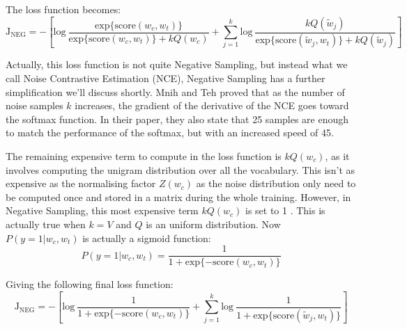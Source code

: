 The loss function becomes:
\begin{equation}
    \text{J}_{\text{NEG}}  = -\left[\text{log}~\frac{\text{exp}\{\text{score}(w_c, w_t)\}}{\text{exp}\{\text{score}(w_c, w_t)\} + kQ(w_c)} + \sum_{j=1}^k\text{log}~\frac{kQ(\tilde{w}_j)}{\text{exp}\{\text{score}(\tilde{w}_j, w_t)\} + kQ(\tilde{w}_j)}\right]
\end{equation}

Actually, this loss function is not quite Negative Sampling, but instead what we call Noise Contrastive Estimation (NCE), Negative Sampling has a further simplification we'll discuss shortly. Mnih and Teh \cite{nce} proved that as the number of noise samples $k$ increases, the gradient of the derivative of the NCE goes toward the softmax function. In their paper, they also state that 25 samples are enough to match the performance of the softmax, but with an increased speed of 45.

The remaining expensive term to compute in the loss function is $kQ(w_c)$, as it involves computing the unigram distribution over all the vocabulary. This isn't as expensive as the normalising factor $Z(w_c)$ as the noise distribution only need to be computed once and stored in a matrix during the whole training. However, in Negative Sampling, this most expensive term $kQ(w_c)$ is set to 1 \cite{word2vec2}. This is actually true when $k=V$ and $Q$ is an uniform distribution.	 Now $P(y=1| w_c, w_t)$ is actually a sigmoid function:
\begin{equation}
    P(y=1| w_c, w_t) = \frac{1}{1 + \text{exp}\{-\text{score}(w_c, w_t)\}}
\end{equation}

Giving the following final loss function:
\begin{equation}
    \text{J}_{\text{NEG}} = -\left[\text{log}~\frac{1}{1 + \text{exp}\{-\text{score}(w_c, w_t)\}} + \sum_{j=1}^k\text{log}~\frac{1}{1 + \text{exp}\{\text{score}(\tilde{w}_j, w_t)\}}\right]
\end{equation}

